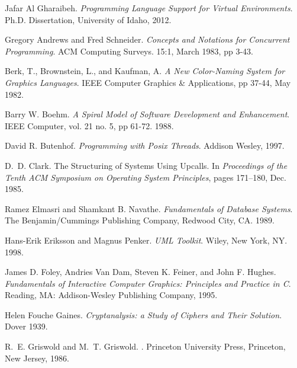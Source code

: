 \begin{thebibliography}{ABCD}

   Jafar Al Gharaibeh.  \emph{Programming Language Support
    for Virtual Environments}. Ph.D. Dissertation, University of Idaho, 2012.

   Gregory Andrews and Fred Schneider.
    \emph{Concepts and Notations for Concurrent Programming}.
    ACM Computing Surveys. 15:1, March 1983, pp 3-43.

   Berk, T., Brownstein, L., and Kaufman, A.
    \emph{A New Color-Naming System for Graphics Languages}.
    IEEE Computer Graphics \& Applications, pp 37-44, May 1982.

   Barry W. Boehm.
    \emph{A Spiral Model of Software Development and Enhancement}.
    IEEE Computer, vol. 21 no. 5, pp 61-72. 1988.

   David R. Butenhof.
    \emph{Programming with Posix Threads}. Addison Wesley, 1997.

D.~D. Clark.                                                                    
\newblock The {S}tructuring of {S}ystems {U}sing {U}pcalls.                     
\newblock In {\em Proceedings of the Tenth ACM Symposium on Operating System    
  Principles}, pages 171--180, Dec. 1985.

   Ramez Elmasri and Shamkant B. Navathe.
    \emph{Fundamentals of Database Systems}.
    The Benjamin/Cummings Publishing Company, Redwood City, CA. 1989.

   Hans-Erik Eriksson and Magnus Penker.
    \emph{UML Toolkit}. Wiley, New York, NY.  1998.

   James D. Foley, Andries Van Dam, Steven K. Feiner, and John
    F. Hughes.  \emph{Fundamentals of Interactive Computer Graphics: Principles
      and Practice in C}. Reading, MA: Addison-Wesley Publishing Company, 1995.

   Helen Fouche Gaines.
    \emph{Cryptanalysis: a Study of Ciphers and Their Solution}. Dover 1939.

R.~E. Griswold and M.~T. Griswold.                                              
.            
\newblock Princeton University Press, Princeton, New Jersey, 1986.              


\end{thebibliography}
